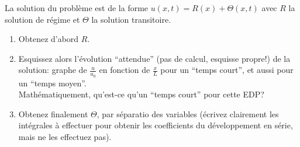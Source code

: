 La solution du problème est de la forme
$u(x, t) = R(x) + \Theta(x, t)$ avec $R$ la solution
de régime et $\Theta$ la solution transitoire.

\begin{enumerate}
  \item Obtenez d'abord $R$.
  \item Esquissez alors l'évolution ``attendue'' (pas de calcul,
    esquisse propre!) de la solution:
    graphe de $\frac{u}{u_0}$ en fonction de $\frac{x}{L}$ pour
    un ``temps court'', et aussi pour un ``temps moyen''.\\
    Mathématiquement, qu'est-ce qu'un ``temps court''
    pour cette EDP?
  \item Obtenez finalement $\Theta$, par séparatio des variables
    (écrivez clairement les intégrales à effectuer pour obtenir
    les coefficients du développement en série,
    mais ne les effectuez pas).
\end{enumerate}
